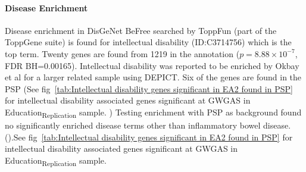 


  \paragraph{Disease Enrichment}
  
  Disease enrichment in DisGeNet BeFree\cite{pinero2020disgenet} searched by ToppFun (part of the ToppGene suite) is found for intellectual disability (ID:C3714756) which is the top term. Twenty genes are found from 1219 in the annotation ($p=8.88\times10^{-7}$, FDR BH=0.00165). Intellectual disability was reported to be enriched by Okbay et al \cite{okbay2016genome} for a larger related sample using DEPICT. Six of the genes are found in the PSP (See fig~\ref{tab:Intellectual disability genes significant in EA2 found in PSP} for intellectual disability associated genes significant at GWGAS in Education\textsubscript{Replication} sample. ) Testing enrichment with PSP as background found no significantly enriched disease terms other than inflammatory bowel disease. ().See fig~\ref{tab:Intellectual disability genes significant in EA2 found in PSP} for intellectual disability associated genes significant at GWGAS in Education\textsubscript{Replication} sample. 
        
